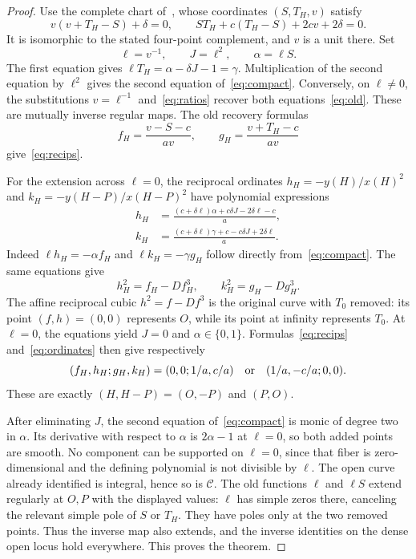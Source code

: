 \documentclass[11pt,a4paper]{article}
\theoremstyle{remark}\newtheorem{remark}[theorem]{Remark}
\begin{document}
\begin{proof}
Use the complete chart of~\cite{Three}, whose coordinates $(S,T_H,v)$
satisfy
\begin{equation}\label{eq:old}
 v(v+T_H-S)+\delta=0,\qquad
 ST_H+c(T_H-S)+2cv+2\delta=0.
\end{equation}
It is isomorphic to the stated four-point complement, and $v$ is a
unit there. Set
\[
 \ell=v^{-1},\qquad J=\ell^2,\qquad\alpha=\ell S.
\]
The first equation gives $\ell T_H=\alpha-\delta J-1=\gamma$.
Multiplication of the second equation by $\ell^2$ gives
the second equation of~\eqref{eq:compact}. Conversely, on $\ell\ne0$,
the substitutions $v=\ell^{-1}$ and~\eqref{eq:ratios} recover
both equations~\eqref{eq:old}. These are mutually inverse regular
maps. The old recovery formulas
\[
 f_H=\frac{v-S-c}{av},\qquad
 g_H=\frac{v+T_H-c}{av}
\]
give~\eqref{eq:recips}.

For the extension across $\ell=0$, the reciprocal ordinates
$h_H=-y(H)/x(H)^2$ and $k_H=-y(H-P)/x(H-P)^2$ have polynomial
expressions
\begin{equation}\label{eq:ordinates}
 \begin{split}
 h_H&=\frac{(c+\delta\ell)\alpha+c\delta J-2\delta\ell-c}{a},\\
 k_H&=\frac{(c+\delta\ell)\gamma+c-c\delta J+2\delta\ell}{a}.
 \end{split}
\end{equation}
Indeed $\ell h_H=-\alpha f_H$ and
$\ell k_H=-\gamma g_H$ follow directly from~\eqref{eq:compact}.
The same equations give
\[
 h_H^2=f_H-Df_H^3,\qquad k_H^2=g_H-Dg_H^3.
\]
The affine reciprocal cubic $h^2=f-Df^3$ is the original curve with
$T_0$ removed: its point $(f,h)=(0,0)$ represents $O$, while its
point at infinity represents $T_0$. At $\ell=0$, the equations yield
$J=0$ and $\alpha\in\{0,1\}$. Formulas~\eqref{eq:recips}
and~\eqref{eq:ordinates} then give respectively
\[
 (f_H,h_H;g_H,k_H)=(0,0;1/a,c/a)
 \quad\hbox{or}\quad(1/a,-c/a;0,0).
\]
These are exactly $(H,H-P)=(O,-P)$ and $(P,O)$.

After eliminating $J$, the second equation of~\eqref{eq:compact}
is monic of degree two in $\alpha$. Its derivative with respect to
$\alpha$ is $2\alpha-1$ at $\ell=0$, so both added points are smooth.
No component can be supported on $\ell=0$, since that fiber is
zero-dimensional and the defining polynomial is not divisible by
$\ell$. The open curve already identified is integral, hence so
is $\mathcal C$. The old functions $\ell$ and $\ell S$ extend
regularly at $O,P$ with the displayed values: $\ell$ has simple
zeros there, canceling the relevant simple pole of $S$ or $T_H$.
They have poles only at the two removed points. Thus the inverse
map also extends, and the inverse identities on the dense open
locus hold everywhere. This proves the theorem.
\end{proof}
\end{document}

